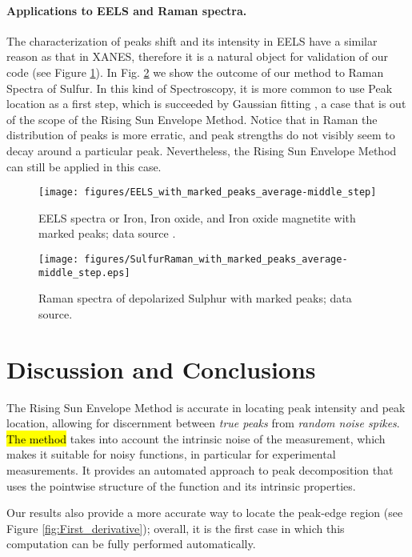 \documentclass[%
 reprint,
 amsmath,amssymb,
 aps,
]{revtex4-1}
\newcommand{\red}[1]{\textcolor{red}{#1}}
\begin{document}
\paragraph{Applications to EELS and Raman spectra.}\label{subsec:eels_raman}

The characterization of peaks shift and its intensity in EELS have a similar reason as that in XANES, therefore it is a natural object for validation of our code (see Figure \ref{fig:EELS}).
In Fig. \ref{fig:Raman} we show the outcome of our method to Raman Spectra of Sulfur.  In this kind of Spectroscopy, it is more common to use Peak location as a first step, which is succeeded by  Gaussian fitting  \cite{byler1988raman}, a case that is out of the scope of the Rising Sun Envelope Method.  Notice that in Raman the distribution of peaks is more erratic, and peak strengths do not visibly seem to decay around a particular peak. Nevertheless, the Rising Sun Envelope Method can still be applied in this case.  

\begin{figure}[htb]
 \texttt{[image: figures/EELS\_with\_marked\_peaks\_average-middle\_step]}
 \caption{EELS spectra or Iron, Iron oxide, and  Iron oxide magnetite with marked peaks; data source \cite{EELS}.\label{fig:EELS}}
\end{figure}



\begin{figure}[htb]
 \texttt{[image: figures/SulfurRaman\_with\_marked\_peaks\_average-middle\_step.eps]}
 \caption{Raman spectra of depolarized Sulphur with marked peaks; data source\cite{RUFF}.  \label{fig:Raman}}
\end{figure}


\section*{Discussion and Conclusions}
\noindent

The Rising Sun Envelope Method is accurate in locating peak intensity and peak location, allowing for discernment between \textit{true peaks} from \textit{random noise spikes}. \hl{The method} takes into account the intrinsic noise of the measurement, which makes it suitable for noisy functions, in particular for experimental measurements. It  provides an automated approach to peak decomposition that uses the pointwise structure of the function and its intrinsic properties.

Our results also provide a more accurate way to locate the peak-edge region (see Figure \ref{fig:First_derivative}); overall, it is the first case in which this computation can be fully performed automatically.
\end{document}

